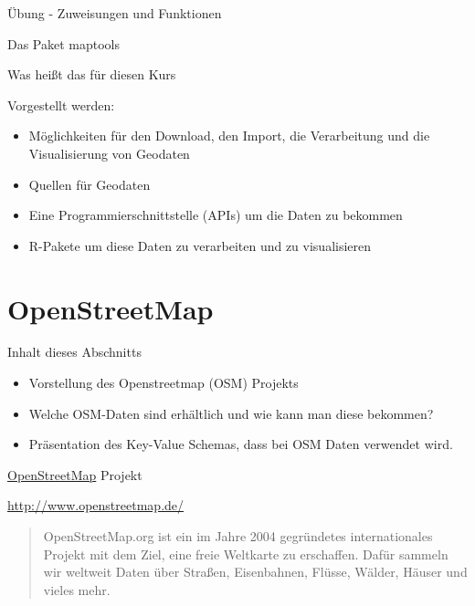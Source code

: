 \documentclass[ignorenonframetext,]{beamer}
\providecommand{\tightlist}{%
  \setlength{\itemsep}{0pt}\setlength{\parskip}{0pt}}
\begin{document}
\begin{frame}[fragile]{Übung - Zuweisungen und Funktionen}
\begin{frame}[fragile]{Das Paket maptools}
\begin{frame}{Was heißt das für diesen Kurs}
\begin{block}{Vorgestellt werden:}
\begin{itemize}
\tightlist
\item
  Möglichkeiten für den Download, den Import, die Verarbeitung und die
  Visualisierung von Geodaten
\end{itemize}

\begin{itemize}
\tightlist
\item
  Quellen für Geodaten
\item
  Eine Programmierschnittstelle (APIs) um die Daten zu bekommen
\item
  R-Pakete um diese Daten zu verarbeiten und zu visualisieren
\end{itemize}

\end{block}

\end{frame}

\section{OpenStreetMap}\label{openstreetmap}

\begin{frame}{Inhalt dieses Abschnitts}

\begin{itemize}
\tightlist
\item
  Vorstellung des Openstreetmap (OSM) Projekts
\item
  Welche OSM-Daten sind erhältlich und wie kann man diese bekommen?
\item
  Präsentation des Key-Value Schemas, dass bei OSM Daten verwendet wird.
\end{itemize}

\end{frame}

\begin{frame}{\href{http://www.openstreetmap.de/}{OpenStreetMap}
Projekt}

\begin{block}{\url{http://www.openstreetmap.de/}}

\begin{quote}
OpenStreetMap.org ist ein im Jahre 2004 gegründetes internationales
Projekt mit dem Ziel, eine freie Weltkarte zu erschaffen. Dafür sammeln
wir weltweit Daten über Straßen, Eisenbahnen, Flüsse, Wälder, Häuser und
vieles mehr.
\end{quote}

\end{block}


\end{frame}
\end{frame}
\end{frame}
\end{document}
